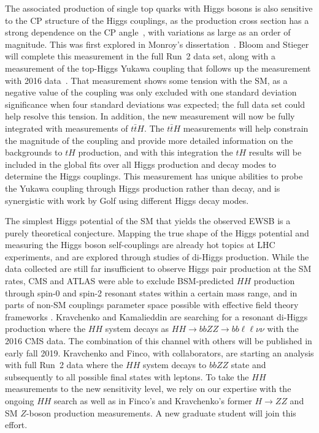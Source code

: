 The associated production of single top quarks with Higgs bosons is also sensitive to the CP structure of the Higgs couplings, as the production cross section has a strong dependence on the CP angle~\cite{bib:tH_theory}, with variations as large as an order of magnitude.  This was first explored in Monroy's dissertation~\cite{bib:monroy_thesis}. Bloom and Stieger will complete this measurement in the full Run~2 data set, along with a measurement of the top-Higgs Yukawa coupling that follows up the measurement with 2016 data~\cite{bib:tHqRun2}.  That measurement shows some tension with the SM, as a negative value of the coupling was only excluded with one standard deviation significance when four standard deviations was expected; the full data set could help resolve this tension.  In addition, the new measurement will now be fully integrated with measurements of $t\bar{t}H$.  The $t\bar{t}H$ measurements will help constrain the magnitude of the coupling and provide more detailed information on the backgrounds to $tH$ production, and with this integration the $tH$ results will be included in the global fits over all Higgs production and decay modes to determine the Higgs couplings.  This measurement has unique abilities to probe the Yukawa coupling through Higgs production rather than decay, and is synergistic with work by Golf using different Higgs decay modes.

The simplest Higgs potential of the SM that yields the observed EWSB is a purely theoretical conjecture. Mapping the true shape of the Higgs potential and measuring the Higgs boson self-couplings are already hot topics at LHC experiments, and are explored through studies of di-Higgs production. While the data collected are still far insufficient to observe Higgs pair production at the SM rates, CMS and ATLAS were able to exclude BSM-predicted $HH$ production through spin-0 and spin-2 resonant states \cite{bib:radion-graviton-CMS,bib:radion-graviton-ATLAS} within a certain mass range, and in parts of non-SM couplings parameter space possible with effective field theory frameworks \cite{bib:HH-benchmarks}. Kravchenko and Kamalieddin are searching for a resonant di-Higgs production where
the $HH$ system decays as $HH\to bbZZ\to bb\ell\ell\nu\nu$ with the 2016 CMS data.
The combination of this channel with others will be published in early fall 2019. Kravchenko and Finco, with collaborators, are starting an analysis with full Run~2 data where the $HH$ system decays to $bbZZ$ state and subsequently to all possible final states with leptons. To take the $HH$ measurements to the new sensitivity level, we rely on our expertise with the ongoing $HH$ search as well as in Finco's and Kravchenko's former $H\to ZZ$ and SM $Z$-boson production measurements. A new graduate student will join this effort.

